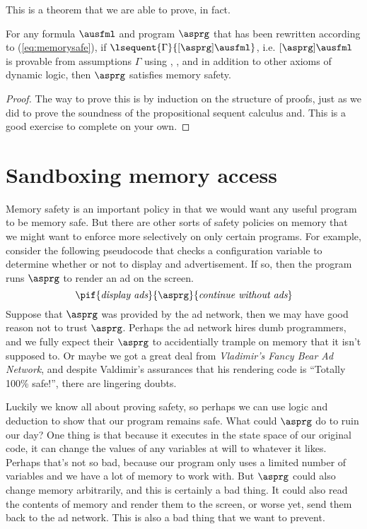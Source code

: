 \documentclass[11pt,twoside]{scrartcl}
\begin{document}
This is a theorem that we are able to prove, in fact.
\begin{theorem}
For any formula $\ausfml$ and program $\asprg$ that has been rewritten according to (\ref{eq:memorysafe}), if $\lsequent{\Gamma}{\dibox{\asprg}{\ausfml}}$, i.e. $\dibox{\asprg}{\ausfml}$ is provable from assumptions $\Gamma$ using , , and  in addition to other axioms of dynamic logic, then $\asprg$ satisfies memory safety.
\end{theorem}
\begin{proof}
The way to prove this is by induction on the structure of proofs, just as we did to prove the soundness of the propositional sequent calculus and. This is a good exercise to complete on your own.
\end{proof}

\section{Sandboxing memory access}
Memory safety is an important policy in that we would want any useful program to be memory safe. But there are other sorts of safety policies on memory that we might want to enforce more selectively on only certain programs. For example, consider the following pseudocode that checks a configuration variable to determine whether or not to display and advertisement. If so, then the program runs $\asprg$ to render an ad on the screen.
\[
\pif{\textit{display ads}}{\asprg}{\textit{continue without ads}}
\]
Suppose that $\asprg$ was provided by the ad network, then we may have good reason not to trust $\asprg$. Perhaps the ad network hires dumb programmers, and we fully expect their $\asprg$ to accidentially trample on memory that it isn't supposed to. Or maybe we got a great deal from \emph{Vladimir's Fancy Bear Ad Network}, and despite Valdimir's assurances that his rendering code is ``Totally 100\% safe!'', there are lingering doubts. 

Luckily we know all about proving safety, so perhaps we can use logic and deduction to show that our program remains safe. What could $\asprg$ do to ruin our day? One thing is that because it executes in the state space of our original code, it can change the values of any variables at will to whatever it likes. Perhaps that's not so bad, because our program only uses a limited number of variables and we have a lot of memory to work with. But $\asprg$ could also change memory arbitrarily, and this is certainly a bad thing. It could also read the contents of memory and render them to the screen, or worse yet, send them back to the ad network. This is also a bad thing that we want to prevent.
\end{document}
